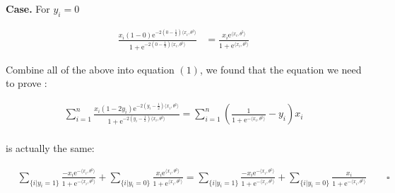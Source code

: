 \documentclass{article}
\begin{document}
\textbf{Case.} For \( y_i = 0 \)

\begin{align*}
    \frac{x_i (1 - 0)\mathrm{e}^{-2(0 - \frac{1}{2})\langle x_i, \theta^{\natural} \rangle}}{1 + \mathrm{e}^{-2(0 - \frac{1}{2})\langle x_i, \theta^{\natural} \rangle}}
    &= \frac{x_i \mathrm{e}^{\langle x_i, \theta^{\natural} \rangle}}{1 + \mathrm{e}^{\langle x_i, \theta^{\natural} \rangle}}
\end{align*}

Combine all of the above into equation $(1)$, we found that the equation we need to prove :

\begin{align*}
    \sum_{i = 1}^n \frac{x_i (1 - 2y_i)\mathrm{e}^{-2(y_i - \frac{1}{2})\langle x_i, \theta^{\natural} \rangle}}{1 + \mathrm{e}^{-2(y_i - \frac{1}{2})\langle x_i, \theta^{\natural} \rangle}} 
    = \sum_{i = 1}^n \left( \frac{1}{1 + \mathrm{e}^{-\langle x_i, \theta^{\natural} \rangle}} - y_i \right) x_i \\
\end{align*}    

is actually the same:

\begin{align*}
    &\sum_{\{i | y_i = 1\}} \frac{- x_i \mathrm{e}^{-\langle x_i, \theta^{\natural} \rangle}}{1 + \mathrm{e}^{-\langle x_i, \theta^{\natural} \rangle}} + \sum_{\{i | y_i = 0\}} \frac{x_i \mathrm{e}^{\langle x_i, \theta^{\natural} \rangle}}{1 + \mathrm{e}^{\langle x_i, \theta^{\natural} \rangle}} 
    = \sum_{\{i | y_i = 1\}} \frac{- x_i \mathrm{e}^{-\langle x_i, \theta^{\natural} \rangle}}{1 + \mathrm{e}^{-\langle x_i, \theta^{\natural} \rangle}} + \sum_{\{i | y_i = 0\}} \frac{x_i}{1 + \mathrm{e}^{-\langle x_i, \theta^{\natural} \rangle}} \qquad \square
\end{align*}
\end{document}
